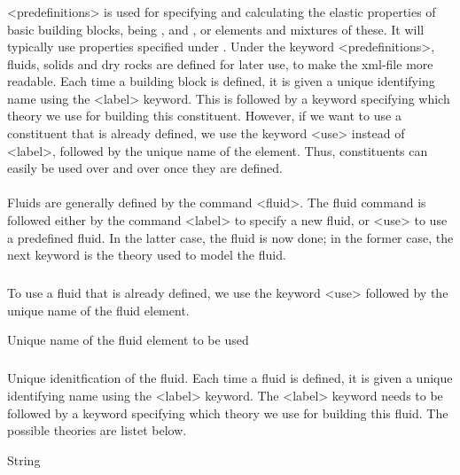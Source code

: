{\subsubsection{}
 \slist
   \item \Description <predefinitions> is used for specifying and calculating the elastic properties of basic building blocks, being ,  and , or elements and mixtures of these. It will typically use properties specified under . Under the keyword <predefinitions>, fluids, solids and dry rocks are defined for later use, to make the xml-file more readable. Each time a building block is defined, it is given a unique identifying name using the <label> keyword. This is followed by a keyword specifying which theory we use for building this constituent. However, if we want to use a constituent that is already defined, we use the keyword <use> instead of <label>, followed by the unique name of the element. Thus, constituents can easily be used over and over once they are defined.
   \item \Argument
   \item \Default
 \elist

\paragraph{}
 \slist
   \item \Description Fluids are generally defined by the command <fluid>. The fluid command is followed either by the command <label> to specify a new fluid, or <use> to use a predefined fluid. In the latter case, the fluid is now done; in the former case, the next keyword is the theory used to model the fluid.
   \item \Argument
   \item \Default
 \elist

\subparagraph{}
 \slist
   \item \Description  To use a fluid that is already defined, we use the keyword <use> followed by the unique name of the fluid element.
   \item \Argument Unique name of the fluid element to be used
   \item \Default
 \elist

\subparagraph{}
 \slist
   \item \Description Unique idenitfication of the fluid. Each time a fluid is defined, it is given a unique identifying name using
the <label> keyword. The <label> keyword needs to be followed by a keyword specifying which theory we use for building this fluid. The possible theories are listet below.
   \item \Argument String
   \item \Default
 \elist

}
